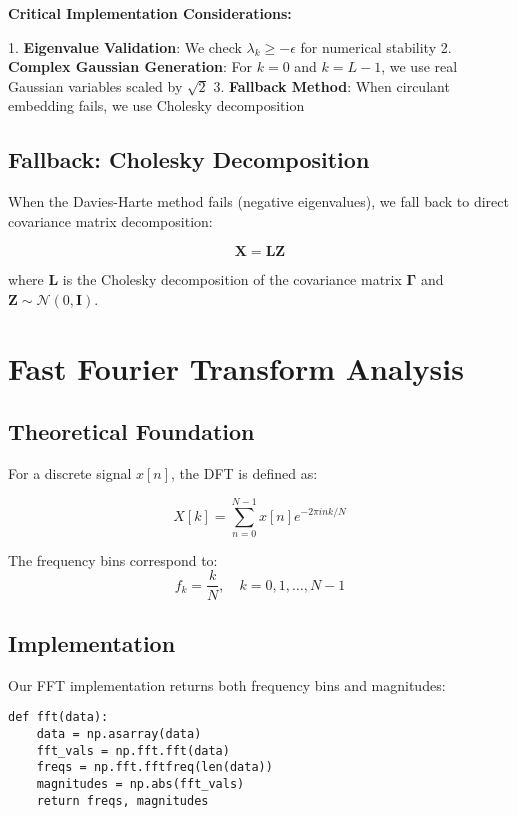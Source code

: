 \documentclass[11pt,a4paper]{article}
\begin{document}
\textbf{Critical Implementation Considerations:}

1. \textbf{Eigenvalue Validation}: We check $\lambda_k \geq -\epsilon$ for numerical stability
2. \textbf{Complex Gaussian Generation}: For $k = 0$ and $k = L-1$, we use real Gaussian variables scaled by $\sqrt{2}$
3. \textbf{Fallback Method}: When circulant embedding fails, we use Cholesky decomposition

\subsection{Fallback: Cholesky Decomposition}

When the Davies-Harte method fails (negative eigenvalues), we fall back to direct covariance matrix decomposition:

\begin{equation}
\mathbf{X} = \mathbf{L}\mathbf{Z}
\end{equation}

where $\mathbf{L}$ is the Cholesky decomposition of the covariance matrix $\mathbf{\Gamma}$ and $\mathbf{Z} \sim \mathcal{N}(0, \mathbf{I})$.

\section{Fast Fourier Transform Analysis}

\subsection{Theoretical Foundation}

For a discrete signal $x[n]$, the DFT is defined as:

\begin{equation}
X[k] = \sum_{n=0}^{N-1} x[n] e^{-2\pi i nk/N}
\end{equation}

The frequency bins correspond to:
\begin{equation}
f_k = \frac{k}{N}, \quad k = 0, 1, \ldots, N-1
\end{equation}

\subsection{Implementation}

Our FFT implementation returns both frequency bins and magnitudes:

\begin{lstlisting}
def fft(data):
    data = np.asarray(data)
    fft_vals = np.fft.fft(data)
    freqs = np.fft.fftfreq(len(data))
    magnitudes = np.abs(fft_vals)
    return freqs, magnitudes
\end{lstlisting}
\end{document}
